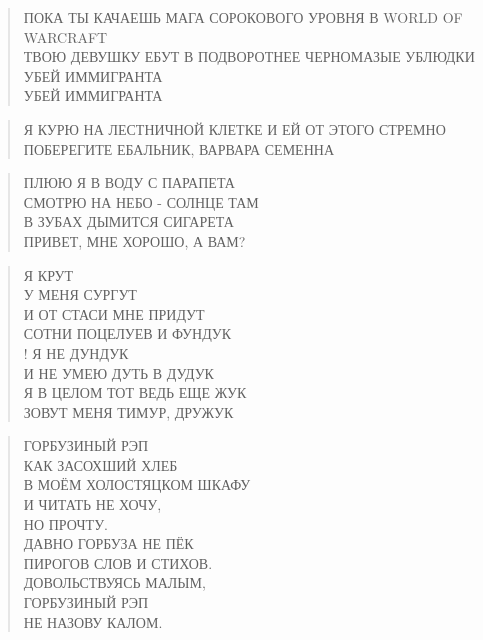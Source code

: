 \poemtitle{***}
\begin{verse}
ПОКА ТЫ КАЧАЕШЬ МАГА СОРОКОВОГО УРОВНЯ В WORLD OF WARCRAFT\\
ТВОЮ ДЕВУШКУ ЕБУТ В ПОДВОРОТНЕЕ ЧЕРНОМАЗЫЕ УБЛЮДКИ\\
УБЕЙ ИММИГРАНТА\\
УБЕЙ ИММИГРАНТА
\end{verse}

\poemtitle{***}
\begin{verse}
Я КУРЮ НА ЛЕСТНИЧНОЙ КЛЕТКЕ И ЕЙ ОТ ЭТОГО СТРЕМНО\\
ПОБЕРЕГИТЕ ЕБАЛЬНИК, ВАРВАРА СЕМЕННА
\end{verse}

\poemtitle{***}
\begin{verse}
ПЛЮЮ Я В ВОДУ С ПАРАПЕТА\\
СМОТРЮ НА НЕБО - СОЛНЦЕ ТАМ\\
В ЗУБАХ ДЫМИТСЯ СИГАРЕТА\\
ПРИВЕТ, МНЕ ХОРОШО, А ВАМ?
\end{verse}

\poemtitle{***}
\begin{verse}
Я КРУТ\\
У МЕНЯ СУРГУТ\\
И ОТ СТАСИ МНЕ ПРИДУТ\\
СОТНИ ПОЦЕЛУЕВ И ФУНДУК\\!
Я НЕ ДУНДУК\\
И НЕ УМЕЮ ДУТЬ В ДУДУК\\
Я В ЦЕЛОМ ТОТ ВЕДЬ ЕЩЕ ЖУК\\
ЗОВУТ МЕНЯ ТИМУР, ДРУЖУК
\end{verse}

\poemtitle{***}
\begin{verse}
ГОРБУЗИНЫЙ РЭП\\
КАК ЗАСОХШИЙ ХЛЕБ\\
В МОЁМ ХОЛОСТЯЦКОМ ШКАФУ\\
И ЧИТАТЬ НЕ ХОЧУ,\\
     НО ПРОЧТУ.\\
ДАВНО ГОРБУЗА НЕ ПЁК\\
ПИРОГОВ СЛОВ И СТИХОВ.\\
ДОВОЛЬСТВУЯСЬ МАЛЫМ,\\
ГОРБУЗИНЫЙ РЭП\\
    НЕ НАЗОВУ КАЛОМ.
\end{verse}

